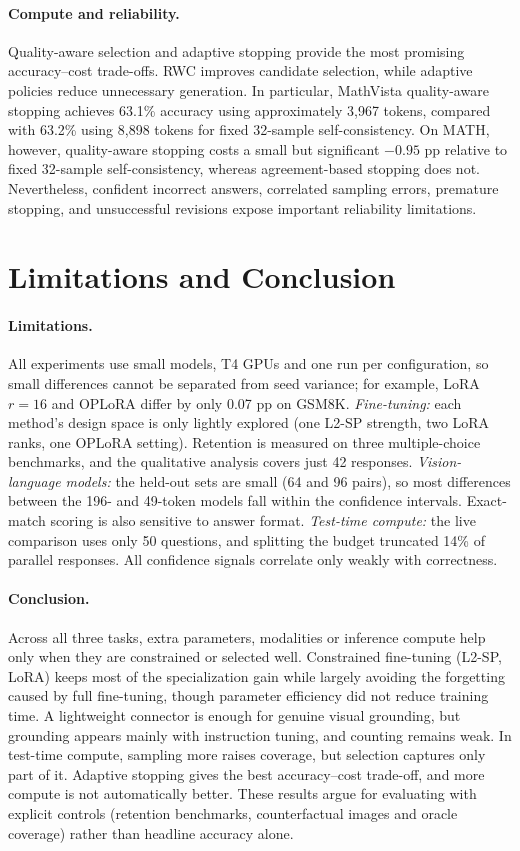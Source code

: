 \documentclass{article}
\begin{document}
\paragraph{Compute and reliability.}
Quality-aware selection and adaptive stopping provide the most promising accuracy--cost trade-offs. RWC improves candidate selection, while adaptive policies reduce unnecessary generation. In particular, MathVista quality-aware stopping achieves 63.1\% accuracy using approximately 3,967 tokens, compared with 63.2\% using 8,898 tokens for fixed 32-sample self-consistency. On MATH, however, quality-aware stopping costs a small but significant $-0.95$ pp relative to fixed 32-sample self-consistency, whereas agreement-based stopping does not. Nevertheless, confident incorrect answers, correlated sampling errors, premature stopping, and unsuccessful revisions expose important reliability limitations.

\section{Limitations and Conclusion}
\label{sec:conclusion}

\paragraph{Limitations.}
All experiments use small models, T4 GPUs and one run per configuration, so small differences cannot be separated from seed variance; for example, LoRA $r{=}16$ and OPLoRA differ by only 0.07 pp on GSM8K. \emph{Fine-tuning:} each method's design space is only lightly explored (one L2-SP strength, two LoRA ranks, one OPLoRA setting). Retention is measured on three multiple-choice benchmarks, and the qualitative analysis covers just 42 responses. \emph{Vision-language models:} the held-out sets are small (64 and 96 pairs), so most differences between the 196- and 49-token models fall within the confidence intervals. Exact-match scoring is also sensitive to answer format. \emph{Test-time compute:} the live comparison uses only 50 questions, and splitting the budget truncated 14\% of parallel responses. All confidence signals correlate only weakly with correctness.

\paragraph{Conclusion.}
Across all three tasks, extra parameters, modalities or inference compute help only when they are constrained or selected well. Constrained fine-tuning (L2-SP, LoRA) keeps most of the specialization gain while largely avoiding the forgetting caused by full fine-tuning, though parameter efficiency did not reduce training time. A lightweight connector is enough for genuine visual grounding, but grounding appears mainly with instruction tuning, and counting remains weak. In test-time compute, sampling more raises coverage, but selection captures only part of it. Adaptive stopping gives the best accuracy--cost trade-off, and more compute is not automatically better. These results argue for evaluating with explicit controls (retention benchmarks, counterfactual images and oracle coverage) rather than headline accuracy alone.
\end{document}
